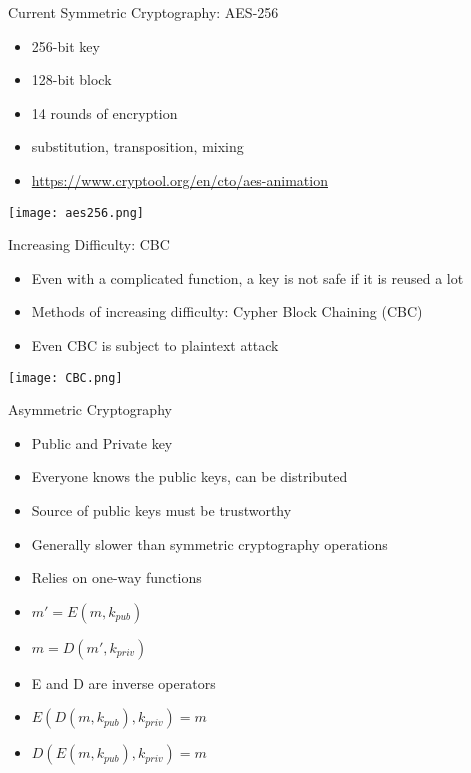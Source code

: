 \begin{frame}{Current Symmetric Cryptography: AES-256}
    \begin{itemize}
        \item 256-bit key
        \item 128-bit block
        \item 14 rounds of encryption
        \item substitution, transposition, mixing
        \item \url{https://www.cryptool.org/en/cto/aes-animation}
    \end{itemize}
    \texttt{[image: aes256.png]}
\end{frame}

\begin{frame}{Increasing Difficulty: CBC}
    \begin{itemize}
        \item Even with a complicated function, a key is not safe if it is reused a lot
        \item Methods of increasing difficulty: Cypher Block Chaining (CBC)
        \item Even CBC is subject to plaintext attack
    \end{itemize}
    \texttt{[image: CBC.png]}
\end{frame}

\begin{frame}{Asymmetric Cryptography}
    \begin{itemize}
        \item Public and Private key
        \item Everyone knows the public keys, can be distributed
        \item Source of public keys must be trustworthy
        \item Generally slower than symmetric cryptography operations
        \item Relies on one-way functions
        \item $m' =E(m, k_{pub})$
        \item $m = D(m', k_{priv})$
        \item E and D are inverse operators
        \item $E(D(m, k_{pub}), k_{priv}) = m$
        \item $D(E(m, k_{pub}), k_{priv}) = m$
    \end{itemize}
\end{frame}


